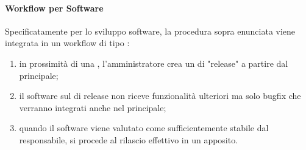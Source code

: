 		\paragraph{Workflow per Software}
		Specificatamente per lo sviluppo software, la procedura sopra enunciata viene integrata in un workflow di tipo :
		\begin{enumerate}
			\item in prossimità di una , l'amministratore crea un  di "release" a partire dal  principale;
			\item il software sul  di release non riceve funzionalità ulteriori ma solo bugfix che verranno integrati anche nel  principale;
			\item quando il software viene valutato come sufficientemente stabile dal responsabile, si procede al rilascio effettivo in un  apposito.
		\end{enumerate}

